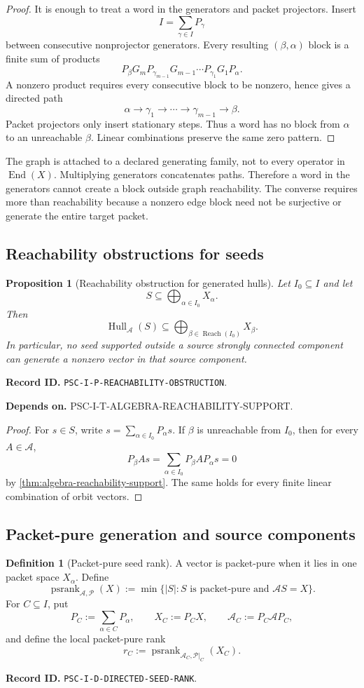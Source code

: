 \documentclass[11pt]{article}
\newtheorem{proposition}[proposition]{Proposition}
\theoremstyle{definition}
\newtheorem{definition}[definition]{Definition}
\theoremstyle{remark}
\newcommand{\A}{\mathcal A}
\newcommand{\Pcal}{\mathcal P}
\newcommand{\Hull}{\operatorname{Hull}}
\newcommand{\psrank}{\operatorname{psrank}}
\newcommand{\End}{\operatorname{End}}
\newcommand{\Reach}{\operatorname{Reach}}
\newcommand{\RecordID}[1]{\par\smallskip\noindent\begingroup\footnotesize\color{PSCGray}\raggedright\textbf{Record ID.} \nolinkurl{#1}.\par\endgroup}
\newcommand{\Depends}[1]{\par\noindent\begingroup\footnotesize\color{PSCGray}\raggedright\textbf{Depends on.} #1\par\endgroup}
\begin{document}
\begin{proof}
It is enough to treat a word in the generators and packet projectors.  Insert
\[
I=\sum_{\gamma\in I}P_\gamma
\]
between consecutive nonprojector generators.  Every resulting $(\beta,\alpha)$ block is a finite sum of products
\[
P_\beta G_mP_{\gamma_{m-1}}
G_{m-1}\cdots
P_{\gamma_1}G_1P_\alpha.
\]
A nonzero product requires every consecutive block to be nonzero, hence gives a directed path
\[
\alpha\to\gamma_1\to\cdots\to\gamma_{m-1}\to\beta.
\]
Packet projectors only insert stationary steps.  Thus a word has no block from $\alpha$ to an unreachable $\beta$.  Linear combinations preserve the same zero pattern.
\end{proof}

\begin{interpretation}
The graph is attached to a declared generating family, not to every operator in \(\End(X)\).  Multiplying generators concatenates paths.  Therefore a word in the generators cannot create a block outside graph reachability.  The converse requires more than reachability because a nonzero edge block need not be surjective or generate the entire target packet.
\end{interpretation}


\subsection{Reachability obstructions for seeds}
\begin{proposition}[Reachability obstruction for generated hulls]
\label{prop:reachability-obstruction}
Let $I_0\subseteq I$ and let
\[
S\subseteq\bigoplus_{\alpha\in I_0}X_\alpha.
\]
Then
\[
\boxed{
\Hull_{\A}(S)
\subseteq
\bigoplus_{\beta\in\Reach(I_0)}X_\beta.
}
\]
In particular, no seed supported outside a source strongly connected component can generate a nonzero vector in that source component.
\end{proposition}
\RecordID{PSC-I-P-REACHABILITY-OBSTRUCTION}
\Depends{PSC-I-T-ALGEBRA-REACHABILITY-SUPPORT.}

\begin{proof}
For $s\in S$, write $s=\sum_{\alpha\in I_0}P_\alpha s$.  If $\beta$ is unreachable from $I_0$, then for every $A\in\A$,
\[
P_\beta As
=
\sum_{\alpha\in I_0}P_\beta AP_\alpha s
=0
\]
by \cref{thm:algebra-reachability-support}.  The same holds for every finite linear combination of orbit vectors.
\end{proof}

\subsection{Packet-pure generation and source components}
\begin{definition}[Packet-pure seed rank]
\label{def:directed-seed-rank}
A vector is packet-pure when it lies in one packet space $X_\alpha$.  Define
\[
\psrank_{\A,\Pcal}(X)
:=
\min\{|S|:S\text{ is packet-pure and }\A S=X\}.
\]
For $C\subseteq I$, put
\[
P_C:=\sum_{\alpha\in C}P_\alpha,
\qquad
X_C:=P_CX,
\qquad
\A_C:=P_C\A P_C,
\]
and define the local packet-pure rank
\[
r_C:=\psrank_{\A_C,\Pcal|_C}(X_C).
\]
\end{definition}
\RecordID{PSC-I-D-DIRECTED-SEED-RANK}
\end{document}
